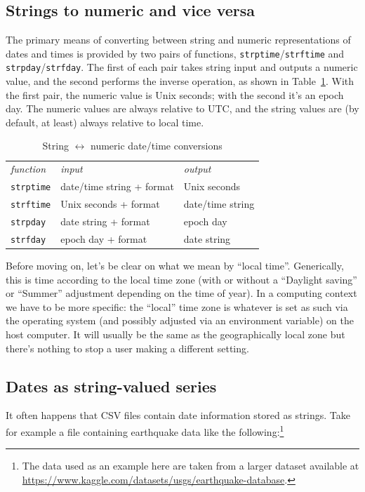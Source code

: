 \subsection{Strings to numeric and vice versa}

The primary means of converting between string and numeric
representations of dates and times is provided by two pairs of
functions, \texttt{strptime}/\texttt{strftime} and
\texttt{strpday}/\texttt{strfday}. The first of each pair takes string
input and outputs a numeric value, and the second performs the inverse
operation, as shown in Table~\ref{tab:timeconv}. With the first pair,
the numeric value is Unix seconds; with the second it's an epoch day.
The numeric values are always relative to UTC, and the string values
are (by default, at least) always relative to local time.

\begin{table}[htbp]
  \centering
  \begin{tabular}{lll}
    \textit{function} & \textit{input} & \textit{output} \\[6pt]
    \texttt{strptime} & date/time string + format & Unix seconds \\
    \texttt{strftime} & Unix seconds + format & date/time string \\[4pt]
    \texttt{strpday}  & date string + format & epoch day \\
    \texttt{strfday}  & epoch day + format & date string
  \end{tabular}
  \caption{String $\longleftrightarrow$ numeric date/time conversions}
  \label{tab:timeconv}
\end{table}

Before moving on, let's be clear on what we mean by ``local time''.
Generically, this is time according to the local time zone (with or
without a ``Daylight saving'' or ``Summer'' adjustment depending on
the time of year). In a computing context we have to be more specific:
the ``local'' time zone is whatever is set as such via the operating
system (and possibly adjusted via an environment variable) on the host
computer. It will usually be the same as the geographically local zone
but there's nothing to stop a user making a different setting.

\subsection{Dates as string-valued series}

It often happens that CSV files contain date information stored as
strings. Take for example a file containing earthquake data like the
following:\footnote{The data used as an example here are taken from a
  larger dataset available at
  \url{https://www.kaggle.com/datasets/usgs/earthquake-database}.}

